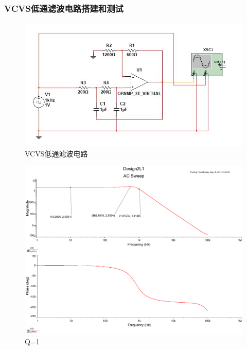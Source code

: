 \documentclass[UTF8,a4paper]{paper}
\begin{document}
\subsubsection{VCVS低通滤波电路搭建和测试}
\begin{figure}
\centering
\includegraphics[width=\textwidth]{L.jpg}
\caption{VCVS低通滤波电路}
\label{L}
\end{figure}
\begin{figure}
\centering
\includegraphics[width=\textwidth]{2L1.pdf}
\caption{Q=1}
\label{LQ1}
\end{figure}
\end{document}
